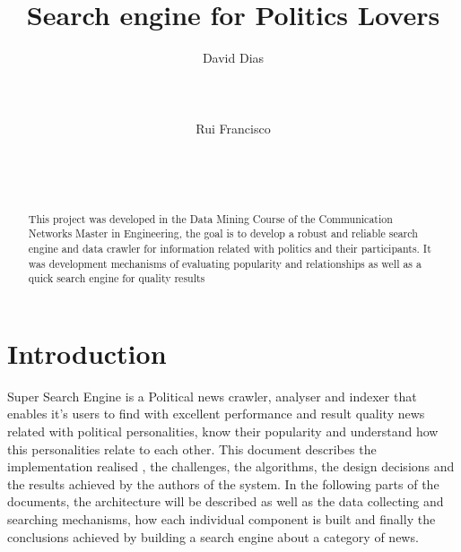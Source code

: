 \documentclass{acm_proc_article-sp}
\begin{document}
\title{Search engine for {\ttlit Politics} Lovers}

\author{
\alignauthor
David Dias\\
       \\
       \\
       \\
\alignauthor
Rui Francisco\\
       \\
       \\
       \\
}
\maketitle
\begin{abstract}
This project was developed in the Data Mining Course of the Communication Networks Master in Engineering, the goal is to develop a robust and reliable search engine and data crawler for information related with politics and their participants. It was development mechanisms of evaluating popularity and relationships as well as a quick search engine for quality results
\end{abstract}



\section{Introduction}
Super Search Engine is a Political news crawler, analyser and indexer that enables it's users to find with excellent performance and result quality news related with political personalities, know their popularity and understand how this personalities relate to each other. This document describes the implementation realised , the challenges, the algorithms, the design decisions and the results achieved by the authors of the system.
In the following parts of the documents, the architecture will be described as well as the data collecting and searching mechanisms, how each individual component is built and finally the conclusions achieved by building a search engine about a category of news.
\end{document}
